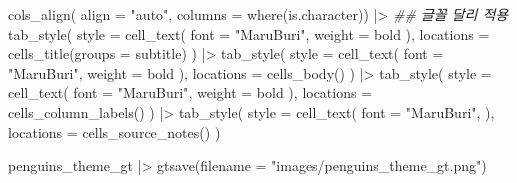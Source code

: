 \documentclass[
  letterpaper,
]{book}
\newenvironment{Shaded}{\begin{snugshade}}{\end{snugshade}}
\newcommand{\AttributeTok}[1]{\textcolor[rgb]{0.40,0.45,0.13}{#1}}
\newcommand{\DocumentationTok}[1]{\textcolor[rgb]{0.37,0.37,0.37}{\textit{#1}}}
\newcommand{\FunctionTok}[1]{\textcolor[rgb]{0.28,0.35,0.67}{#1}}
\newcommand{\NormalTok}[1]{\textcolor[rgb]{0.00,0.23,0.31}{#1}}
\newcommand{\SpecialCharTok}[1]{\textcolor[rgb]{0.37,0.37,0.37}{#1}}
\newcommand{\StringTok}[1]{\textcolor[rgb]{0.13,0.47,0.30}{#1}}
\begin{document}
\begin{Shaded}
\begin{Highlighting}[]
  \FunctionTok{cols\_align}\NormalTok{( }\AttributeTok{align =} \StringTok{"auto"}\NormalTok{, }\AttributeTok{columns =} \FunctionTok{where}\NormalTok{(is.character)) }\SpecialCharTok{|\textgreater{}} 
  \DocumentationTok{\#\# 글꼴 달리 적용}
  \FunctionTok{tab\_style}\NormalTok{(}
    \AttributeTok{style =} \FunctionTok{cell\_text}\NormalTok{(}
      \AttributeTok{font =} \StringTok{"MaruBuri"}\NormalTok{,      }
      \AttributeTok{weight =} \StringTok{\textquotesingle{}bold\textquotesingle{}} 
\NormalTok{    ),}
    \AttributeTok{locations =} \FunctionTok{cells\_title}\NormalTok{(}\AttributeTok{groups =} \StringTok{\textquotesingle{}subtitle\textquotesingle{}}\NormalTok{)}
\NormalTok{  ) }\SpecialCharTok{|\textgreater{}} 
  \FunctionTok{tab\_style}\NormalTok{(}
    \AttributeTok{style =} \FunctionTok{cell\_text}\NormalTok{(}
      \AttributeTok{font =} \StringTok{"MaruBuri"}\NormalTok{,      }
      \AttributeTok{weight =} \StringTok{\textquotesingle{}bold\textquotesingle{}} 
\NormalTok{    ),}
    \AttributeTok{locations =} \FunctionTok{cells\_body}\NormalTok{()}
\NormalTok{  ) }\SpecialCharTok{|\textgreater{}} 
  \FunctionTok{tab\_style}\NormalTok{(}
    \AttributeTok{style =} \FunctionTok{cell\_text}\NormalTok{(}
      \AttributeTok{font =} \StringTok{"MaruBuri"}\NormalTok{,      }
      \AttributeTok{weight =} \StringTok{\textquotesingle{}bold\textquotesingle{}} 
\NormalTok{    ),}
    \AttributeTok{locations =} \FunctionTok{cells\_column\_labels}\NormalTok{()}
\NormalTok{  ) }\SpecialCharTok{|\textgreater{}} 
  \FunctionTok{tab\_style}\NormalTok{(}
    \AttributeTok{style =} \FunctionTok{cell\_text}\NormalTok{(}
      \AttributeTok{font =} \StringTok{"MaruBuri"}\NormalTok{,      }
\NormalTok{    ),}
    \AttributeTok{locations =} \FunctionTok{cells\_source\_notes}\NormalTok{()}
\NormalTok{  )}

\NormalTok{penguins\_theme\_gt }\SpecialCharTok{|\textgreater{}} 
  \FunctionTok{gtsave}\NormalTok{(}\AttributeTok{filename =} \StringTok{"images/penguins\_theme\_gt.png"}\NormalTok{)}
\end{Highlighting}
\end{Shaded}
\end{document}
